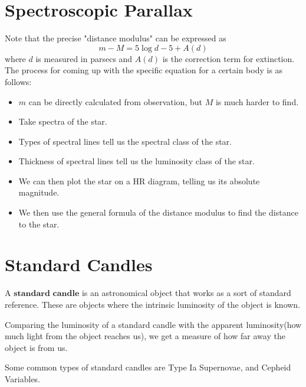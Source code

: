\documentclass{article}
\theoremstyle{definition}
\begin{document}
\section{Spectroscopic Parallax}
Note that the precise "distance modulus" can be expressed as 
$$m-M=5\log d-5+A(d)$$
where $d$ is measured in parsecs and $A(d)$ is the correction term for extinction. The process for coming up with the specific equation for a certain body is as follows:

\begin{itemize}
    \item $m$ can be directly calculated from observation, but $M$ is much harder to find.
    \item Take spectra of the star.
    \item Types of spectral lines tell us the spectral class of the star.
    \item Thickness of spectral lines tell us the luminosity class of the star.
    \item We can then plot the star on a HR diagram, telling us its absolute magnitude.
    \item We then use the general formula of the distance modulus to find the distance to the star.
\end{itemize}
\section{Standard Candles}
\begin{definition}
    A $\textbf{standard candle}$ is an astronomical object that works as a sort of standard reference. These are objects where the intrinsic luminosity of the object is known.
\end{definition}
\begin{note}
    Comparing the luminosity of a standard candle with the apparent luminosity(how much light from the object reaches us), we get a measure of how far away the object is from us.
\end{note}
\begin{note}
    Some common types of standard candles are Type Ia Supernovae, and Cepheid Variables.
\end{note}
\end{document}
